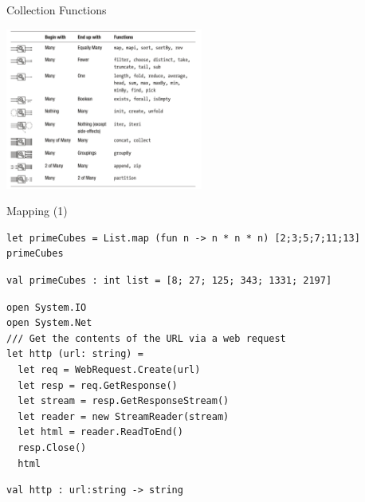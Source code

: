 \documentclass[t]{beamer}
\begin{document}
\begin{frame}[label={sec:orgbbe5b22}]{Collection Functions}
\begin{center}
\includegraphics[height=200]{../img/CollectionFunctions.png}
\label{fig:collection-functions}
\end{center}
\end{frame}

\begin{frame}[label={sec:org80c2dec},fragile]{Mapping (1)}
 \begin{verbatim}
let primeCubes = List.map (fun n -> n * n * n) [2;3;5;7;11;13]
primeCubes
\end{verbatim}

\begin{verbatim}
val primeCubes : int list = [8; 27; 125; 343; 1331; 2197]
\end{verbatim}


\begin{verbatim}
open System.IO 
open System.Net
/// Get the contents of the URL via a web request
let http (url: string) =
  let req = WebRequest.Create(url)
  let resp = req.GetResponse()
  let stream = resp.GetResponseStream() 
  let reader = new StreamReader(stream) 
  let html = reader.ReadToEnd() 
  resp.Close()
  html
\end{verbatim}

\begin{verbatim}
val http : url:string -> string
\end{verbatim}
\end{frame}
\end{document}
